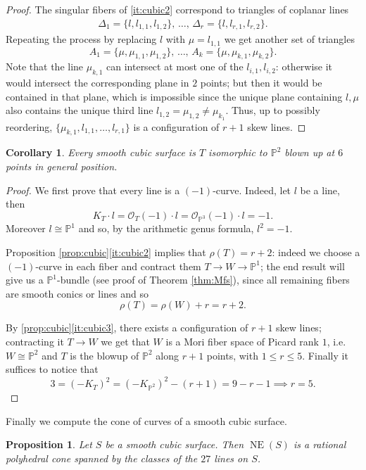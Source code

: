 \documentclass[a4paper,11pt]{amsart}
\newtheorem{corollary}[theorem]{Corollary}
\newtheorem{proposition}[theorem]{Proposition}
\def\NE{\operatorname{NE}}
\newcommand{\OO}{\mathcal{O}}
\newcommand{\PP}{\mathbb{P}}
\newcommand{\isom}{\cong}
\begin{document}
\begin{proof}
	The singular fibers of \eqref{it:cubic2} correspond to triangles of coplanar lines
	\begin{gather*}
		\Delta_1 = \{l,l_{1,1},l_{1,2}\}, \, \dots, \, \Delta_r = \{l,l_{r,1},l_{r,2}\}.
	\end{gather*}
	Repeating the process by replacing $l$ with $\mu = l_{1,1}$ we get another set of triangles
	\[
		A_1 = \{\mu, \mu_{1,1}, \mu_{1,2}\}, \, \dots, \, A_k = \{\mu, \mu_{k,1}, \mu_{k,2}\}.
	\]
	Note that the line $\mu_{k,1}$ can intersect at most one of the $l_{i,1}, l_{i,2}$: otherwise it would intersect the corresponding plane in $2$ points;
	but then it would be contained in that plane, which is impossible since the unique plane containing $l,\mu$ also contains the unique third line $l_{1,2} = \mu_{1,2} \neq \mu_{k_1}$.
	Thus, up to possibly reordering, $\{\mu_{k,1}, l_{1,1}, \dots, l_{r,1}\}$ is a configuration of $r+1$ skew lines.
\end{proof}


\begin{corollary}\label{cor:cubics=blp6}
	Every smooth cubic surface is $T$ isomorphic to $\PP^2$ blown up at $6$ points in general position.
\end{corollary}

\begin{proof}
	We first prove that every line is a $(-1)$-curve.
	Indeed, let $l$ be a line, then
	\[
	K_T \cdot l = \OO_{T}(-1)\cdot l = \OO_{\PP^3}(-1) \cdot l = -1.
	\]
	Moreover $l\isom \PP^1$ and so, by the arithmetic genus formula, $l^2 = -1$.
	
	Proposition \ref{prop:cubic}\eqref{it:cubic2} implies that $\rho(T) = r+2$:
	indeed we choose a $(-1)$-curve in each fiber and contract them $T \to W \to \PP^1$;
	the end result will give us a $\PP^1$-bundle (see proof of Theorem \ref{thm:Mfs}), since all remaining fibers are smooth conics or lines and so
	\[
	\rho(T) = \rho(W) + r = r+2.
	\]
	
	By \ref{prop:cubic}\eqref{it:cubic3}, there exists a configuration of $r+1$ skew lines;
	contracting it $T \to W$ we get that $W$ is a Mori fiber space of Picard rank $1$, i.e.\ $W \isom \PP^2$ and $T$ is the blowup of $\PP^2$ along $r+1$ points, with $1 \leq r \leq 5$.
	Finally it suffices to notice that 
	\[
	3 = (-K_T)^2 = (-K_{\PP^2})^2 - (r+1) = 9 - r -1 \implies r=5.
	\]
\end{proof}


Finally we compute the cone of curves of a smooth cubic surface.

\begin{proposition}
	Let $S$ be a smooth cubic surface.
	Then $\NE(S)$ is a rational polyhedral cone spanned by the classes of the $27$ lines on $S$.
\end{proposition}
\end{document}
